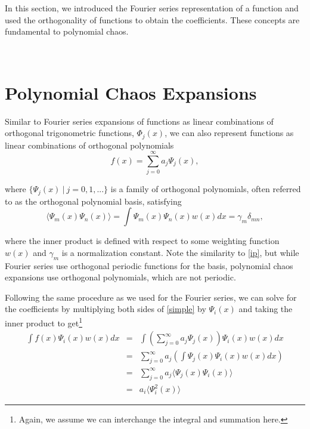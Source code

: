 \documentclass[11pt]{article}
\numberwithin{equation}{section}
\begin{document}
In this section, we introduced the Fourier series representation of a function and used the orthogonality of functions to obtain the coefficients. These concepts are fundamental to polynomial chaos.

\








\section{Polynomial Chaos Expansions}

Similar to Fourier series expansions of functions as linear combinations of orthogonal trigonometric functions, $\Phi_j(x)$, we can also represent functions as linear combinations of orthogonal polynomials
\begin{equation}
f(x) = \sum_{j=0}^{\infty}  a_j \Psi_j(x), \label{simple}
\end{equation}

where $\{ \Psi_j(x) \ | \ j = 0, 1, ... \}$ is a family of orthogonal polynomials, often referred to as the orthogonal polynomial basis, satisfying
\begin{equation}
\langle \Psi_m(x) \Psi_n(x) \rangle = \int \Psi_m(x) \Psi_n(x) w(x) dx = \gamma_m \delta_{mn}, \label{orth_poly}
\end{equation}

where the inner product is defined with respect to some weighting function $w(x)$ and $\gamma_m$ is a normalization constant. Note the similarity to \eqref{ip}, but while Fourier series use orthogonal periodic functions for the basis, polynomial chaos expansions use orthogonal polynomials, which are not periodic.

\qquad Following the same procedure as we used for the Fourier series, we can solve for the coefficients by multiplying both sides of \eqref{simple} by $\Psi_i(x)$ and taking the inner product to get\footnote{Again, we assume we can interchange the integral and summation here.} 
\begin{eqnarray*}
\int f(x) \Psi_i(x) w(x) dx & = & \int \left( \sum_{j = 0}^{\infty} a_j \Psi_j(x) \right) \Psi_i(x) w(x) dx \\
& = & \sum_{j = 0}^{\infty}  a_j  \left( \int \Psi_j(x) \Psi_i(x) w(x) dx \right) \\
& = & \sum_{j = 0}^{\infty}  a_j  \langle \Psi_j(x) \Psi_i(x) \rangle \\
& = & a_i  \langle \Psi_i^2(x) \rangle
\end{eqnarray*}
\end{document}
